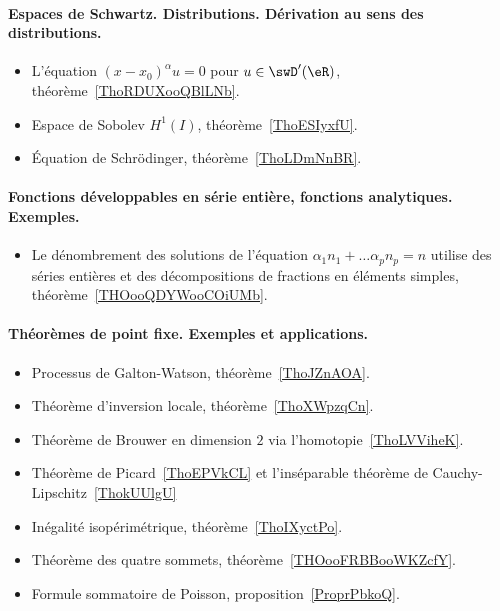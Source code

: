 \paragraph{Espaces de Schwartz. Distributions. Dérivation au sens des distributions.}
\begin{itemize}
	\item L'équation \( (x-x_0)^{\alpha}u=0\) pour \( u\in\swD'(\eR)\), théorème~\ref{ThoRDUXooQBlLNb}.
	\item Espace de Sobolev \( H^1(I)\), théorème~\ref{ThoESIyxfU}.
	\item Équation de Schrödinger, théorème~\ref{ThoLDmNnBR}.
\end{itemize}

\paragraph{Fonctions développables en série entière, fonctions analytiques. Exemples.}
\begin{itemize}
	\item Le dénombrement des solutions de l'équation \( \alpha_1 n_1+\ldots \alpha_pn_p=n\) utilise des séries entières et des décompositions de fractions en éléments simples, théorème~\ref{THOooQDYWooCOiUMb}.
\end{itemize}
\paragraph{Théorèmes de point fixe. Exemples et applications.}
\begin{itemize}
	\item Processus de Galton-Watson, théorème~\ref{ThoJZnAOA}.
	\item Théorème d'inversion locale, théorème~\ref{ThoXWpzqCn}.
	\item Théorème de Brouwer en dimension \( 2\) via l'homotopie~\ref{ThoLVViheK}.
	\item Théorème de Picard~\ref{ThoEPVkCL} et l'inséparable théorème de Cauchy-Lipschitz~\ref{ThokUUlgU}
\end{itemize}
\begin{itemize}
	\item Inégalité isopérimétrique, théorème~\ref{ThoIXyctPo}.
	\item Théorème des quatre sommets, théorème~\ref{THOooFRBBooWKZcfY}.
\end{itemize}
\begin{itemize}
	\item Formule sommatoire de Poisson, proposition~\ref{ProprPbkoQ}.
\end{itemize}
